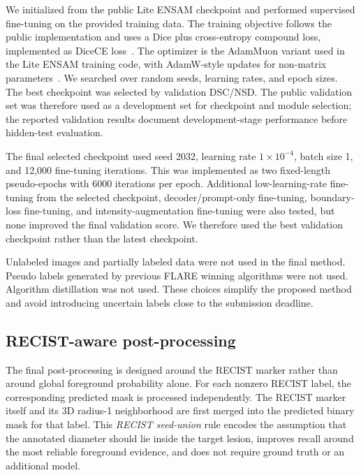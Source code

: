 \documentclass[runningheads]{llncs}
\begin{document}
We initialized from the public Lite ENSAM checkpoint and performed supervised fine-tuning on the provided training data. The training objective follows the public implementation and uses a Dice plus cross-entropy compound loss, implemented as DiceCE loss~\cite{LossOdyssey}. The optimizer is the AdamMuon variant used in the Lite ENSAM training code, with AdamW-style updates for non-matrix parameters~\cite{AdamW}. We searched over random seeds, learning rates, and epoch sizes. The best checkpoint was selected by validation DSC/NSD. The public validation set was therefore used as a development set for checkpoint and module selection; the reported validation results document development-stage performance before hidden-test evaluation.

The final selected checkpoint used seed 2032, learning rate $1\times 10^{-4}$, batch size 1, and 12,000 fine-tuning iterations. This was implemented as two fixed-length pseudo-epochs with 6000 iterations per epoch. Additional low-learning-rate fine-tuning from the selected checkpoint, decoder/prompt-only fine-tuning, boundary-loss fine-tuning, and intensity-augmentation fine-tuning were also tested, but none improved the final validation score. We therefore used the best validation checkpoint rather than the latest checkpoint.

Unlabeled images and partially labeled data were not used in the final method. Pseudo labels generated by previous FLARE winning algorithms were not used. Algorithm distillation was not used. These choices simplify the proposed method and avoid introducing uncertain labels close to the submission deadline.

\subsection{RECIST-aware post-processing}
\label{sec:postprocessing}

The final post-processing is designed around the RECIST marker rather than around global foreground probability alone. For each nonzero RECIST label, the corresponding predicted mask is processed independently. The RECIST marker itself and its 3D radius-1 neighborhood are first merged into the predicted binary mask for that label. This \emph{RECIST seed-union} rule encodes the assumption that the annotated diameter should lie inside the target lesion, improves recall around the most reliable foreground evidence, and does not require ground truth or an additional model.
\end{document}
